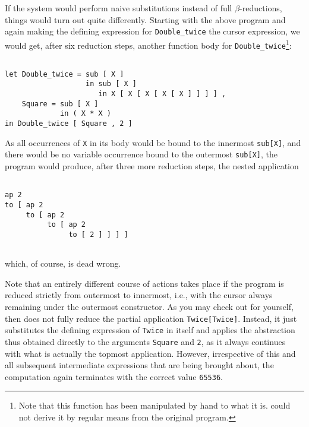If the system would perform {\mys naive substitutions} instead of full
$\beta$-reductions, things would turn out quite  differently. Starting 
with the above program and again making the defining expression for
{\tt Double\_twice} the cursor expression, we would get, after six reduction steps,
another function body for {\tt Double\_twice}\footnote{Note that this 
function has been manipulated by hand to what it is. \pired could
not derive it by regular means from the original program.}:
\begin{verbatim}

let Double_twice = sub [ X ]
                   in sub [ X ]
                      in X [ X [ X [ X [ X ] ] ] ] ,
    Square = sub [ X ]
             in ( X * X )
in Double_twice [ Square , 2 ]

\end{verbatim}
As all  occurrences of {\tt X} in its body would be bound to the innermost
{\tt sub[X]}, and there would be no variable occurrence bound to the
outermost {\tt sub[X]}, the program would produce, after three more
reduction steps, the nested application
\begin{verbatim}

ap 2
to [ ap 2
     to [ ap 2
          to [ ap 2
               to [ 2 ] ] ] ]


\end{verbatim}
which, of course, is dead wrong.

Note that an entirely different course of actions takes place if the
program is reduced strictly from outermost to innermost, i.e., with
the cursor always remaining under the outermost constructor. As you
 may check out for yourself, \pired then does not fully reduce the
partial application {\tt Twice[Twice]}. Instead, it just substitutes the 
defining expression
of {\tt Twice} in itself and applies the abstraction thus obtained
directly to the
arguments {\tt Square} and {\tt 2}, as it always continues with what
is actually the topmost application. However, irrespective of this
and all subsequent 
intermediate expressions that are being brought about, the computation 
again terminates with the correct value {\tt 65536}.

